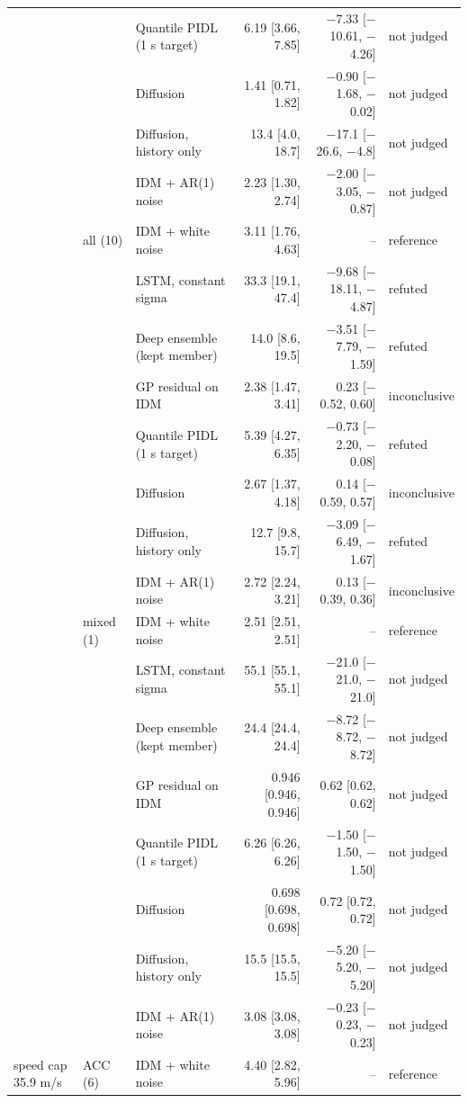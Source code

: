 \begin{longtable}{lllrrl}
 &  & Quantile PIDL (1 s target) & 6.19 [3.66, 7.85] & $-$7.33 [$-$10.61, $-$4.26] & not judged \\
 &  & Diffusion & 1.41 [0.71, 1.82] & $-$0.90 [$-$1.68, $-$0.02] & not judged \\
 &  & Diffusion, history only & 13.4 [4.0, 18.7] & $-$17.1 [$-$26.6, $-$4.8] & not judged \\
 &  & IDM + AR(1) noise & 2.23 [1.30, 2.74] & $-$2.00 [$-$3.05, $-$0.87] & not judged \\
\midrule
 & all (10) & IDM + white noise & 3.11 [1.76, 4.63] & -- & reference \\
 &  & LSTM, constant sigma & 33.3 [19.1, 47.4] & $-$9.68 [$-$18.11, $-$4.87] & refuted \\
 &  & Deep ensemble (kept member) & 14.0 [8.6, 19.5] & $-$3.51 [$-$7.79, $-$1.59] & refuted \\
 &  & GP residual on IDM & 2.38 [1.47, 3.41] & 0.23 [$-$0.52, 0.60] & inconclusive \\
 &  & Quantile PIDL (1 s target) & 5.39 [4.27, 6.35] & $-$0.73 [$-$2.20, $-$0.08] & refuted \\
 &  & Diffusion & 2.67 [1.37, 4.18] & 0.14 [$-$0.59, 0.57] & inconclusive \\
 &  & Diffusion, history only & 12.7 [9.8, 15.7] & $-$3.09 [$-$6.49, $-$1.67] & refuted \\
 &  & IDM + AR(1) noise & 2.72 [2.24, 3.21] & 0.13 [$-$0.39, 0.36] & inconclusive \\
\midrule
 & mixed (1) & IDM + white noise & 2.51 [2.51, 2.51] & -- & reference \\
 &  & LSTM, constant sigma & 55.1 [55.1, 55.1] & $-$21.0 [$-$21.0, $-$21.0] & not judged \\
 &  & Deep ensemble (kept member) & 24.4 [24.4, 24.4] & $-$8.72 [$-$8.72, $-$8.72] & not judged \\
 &  & GP residual on IDM & 0.946 [0.946, 0.946] & 0.62 [0.62, 0.62] & not judged \\
 &  & Quantile PIDL (1 s target) & 6.26 [6.26, 6.26] & $-$1.50 [$-$1.50, $-$1.50] & not judged \\
 &  & Diffusion & 0.698 [0.698, 0.698] & 0.72 [0.72, 0.72] & not judged \\
 &  & Diffusion, history only & 15.5 [15.5, 15.5] & $-$5.20 [$-$5.20, $-$5.20] & not judged \\
 &  & IDM + AR(1) noise & 3.08 [3.08, 3.08] & $-$0.23 [$-$0.23, $-$0.23] & not judged \\
\midrule
speed cap 35.9 m/s & ACC (6) & IDM + white noise & 4.40 [2.82, 5.96] & -- & reference \\

\end{longtable}
